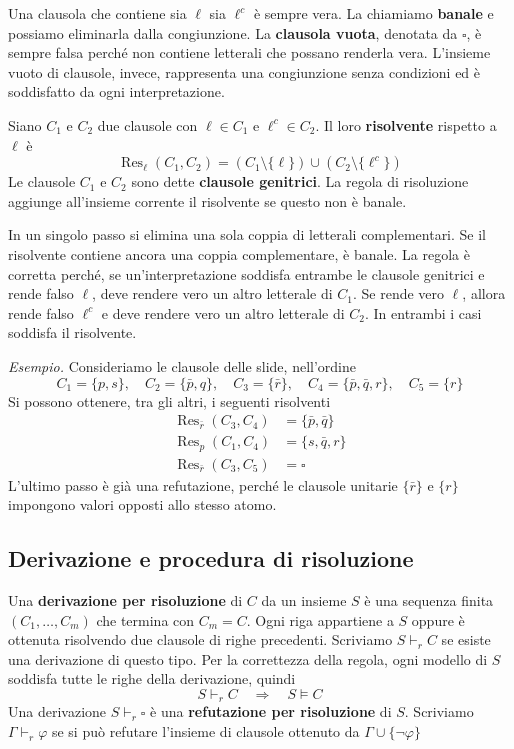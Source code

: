 \medskip
\noindent
Una clausola che contiene sia $\ell$ sia $\ell^c$ è sempre vera.
La chiamiamo \textbf{banale} e possiamo eliminarla dalla congiunzione.
La \textbf{clausola vuota}, denotata da $\square$, è sempre falsa
perché non contiene letterali che possano renderla vera. L'insieme
vuoto di clausole, invece, rappresenta una congiunzione senza
condizioni ed è soddisfatto da ogni interpretazione.

\medskip
\noindent
\colorbox{SALZO}{\parbox{\dimexpr\linewidth-2\fboxsep}{
\begin{definition}[Risolvente]
    Siano $C_1$ e $C_2$ due clausole con $\ell\in C_1$ e
    $\ell^c\in C_2$. Il loro \textbf{risolvente} rispetto a $\ell$ è
    \[
        \operatorname{Res}_{\ell}(C_1,C_2)
        =(C_1\setminus\{\ell\})\cup(C_2\setminus\{\ell^c\})
    \]
    Le clausole $C_1$ e $C_2$ sono dette \textbf{clausole genitrici}.
    La regola di risoluzione aggiunge all'insieme corrente il
    risolvente se questo non è banale.
\end{definition}
}}%

\medskip
\noindent
In un singolo passo si elimina una sola coppia di letterali
complementari. Se il risolvente contiene ancora una coppia
complementare, è banale. La regola è corretta perché, se
un'interpretazione soddisfa entrambe le clausole genitrici e
rende falso $\ell$, deve rendere vero un altro letterale di $C_1$.
Se rende vero $\ell$, allora rende falso $\ell^c$ e deve rendere vero
un altro letterale di $C_2$. In entrambi i casi soddisfa il risolvente.

\medskip
\noindent
\textit{Esempio.} Consideriamo le clausole delle slide, nell'ordine
\[
    C_1=\{p,s\},\quad C_2=\{\bar p,q\},\quad C_3=\{\bar r\},
    \quad C_4=\{\bar p,\bar q,r\},\quad C_5=\{r\}
\]
Si possono ottenere, tra gli altri, i seguenti risolventi
\[
    \begin{aligned}
        \operatorname{Res}_{\bar r}(C_3,C_4)&=\{\bar p,\bar q\}\\
        \operatorname{Res}_{p}(C_1,C_4)&=\{s,\bar q,r\}\\
        \operatorname{Res}_{\bar r}(C_3,C_5)&=\square
    \end{aligned}
\]
L'ultimo passo è già una refutazione, perché le clausole unitarie
$\{\bar r\}$ e $\{r\}$ impongono valori opposti allo stesso atomo.

\subsection{Derivazione e procedura di risoluzione}
Una \textbf{derivazione per risoluzione} di $C$ da un insieme
$S$ è una sequenza finita $(C_1,\ldots,C_m)$ che termina con
$C_m=C$. Ogni riga appartiene a $S$ oppure è ottenuta risolvendo
due clausole di righe precedenti. Scriviamo $S\vdash_r C$ se esiste
una derivazione di questo tipo. Per la correttezza della regola,
ogni modello di $S$ soddisfa tutte le righe della derivazione, quindi
\[
    S\vdash_r C\quad\Longrightarrow\quad S\models C
\]
Una derivazione $S\vdash_r\square$ è una \textbf{refutazione per
risoluzione} di $S$. Scriviamo $\Gamma\vdash_r\varphi$ se si può
refutare l'insieme di clausole ottenuto da
$\Gamma\cup\{\neg\varphi\}$

